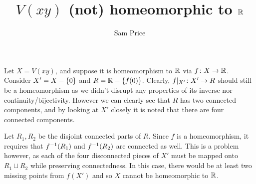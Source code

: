 \documentclass{article}
\author{Sam Price}
\title{$V(xy)$ (not) homeomorphic to $\mathbb{R}^{}$}
\begin{document}
\maketitle

Let $X = V(xy)$, and suppose it is homeomorphism to $\mathbb{R}^{}$ via $f \colon X \to \mathbb{R}^{}$.
Consider $X' = X - \lbrace0\rbrace$ and $R = \mathbb{R}^{} - \lbrace f(0) \rbrace$.
Clearly, $f|_{X'} \colon X' \to R$ should still be a homeomorphism as we didn't disrupt any properties of its inverse nor continuity/bijectivity.
However we can clearly see that $R$ has two connected components, and by looking at $X'$ closely it is noted that there are four connected components.

Let $R_{1}, R_{2}$ be the disjoint connected parts of $R$. Since $f$ is a homeomorphism, it requires that $f^{-1}(R_{1})$ and $f^{-1}(R_{2})$ are connected as well.
This is a problem however, as each of the four disconnected pieces of $X'$ must be mapped onto $R_{1} \sqcup R_{2}$ while preserving connectedness.
In this case, there would be at least two missing points from $f(X')$ and so $X$ cannot be homeomorphic to $\mathbb{R}^{}$.
\end{document}
